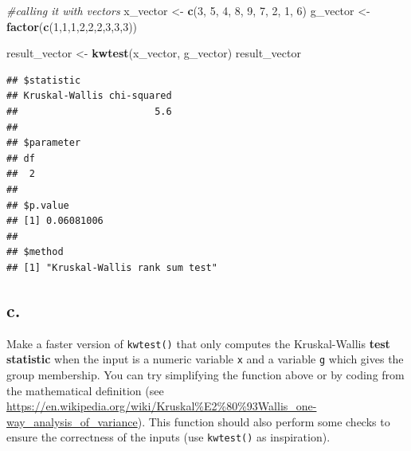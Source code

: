 \documentclass[
]{article}
\newenvironment{Shaded}{\begin{snugshade}}{\end{snugshade}}
\newcommand{\CommentTok}[1]{\textcolor[rgb]{0.56,0.35,0.01}{\textit{#1}}}
\newcommand{\DecValTok}[1]{\textcolor[rgb]{0.00,0.00,0.81}{#1}}
\newcommand{\FunctionTok}[1]{\textcolor[rgb]{0.13,0.29,0.53}{\textbf{#1}}}
\newcommand{\NormalTok}[1]{#1}
\newcommand{\OtherTok}[1]{\textcolor[rgb]{0.56,0.35,0.01}{#1}}
\begin{document}
\begin{Shaded}
\begin{Highlighting}[]
\CommentTok{\#calling it with vectors}
\NormalTok{x\_vector }\OtherTok{\textless{}{-}} \FunctionTok{c}\NormalTok{(}\DecValTok{3}\NormalTok{, }\DecValTok{5}\NormalTok{, }\DecValTok{4}\NormalTok{, }\DecValTok{8}\NormalTok{, }\DecValTok{9}\NormalTok{, }\DecValTok{7}\NormalTok{, }\DecValTok{2}\NormalTok{, }\DecValTok{1}\NormalTok{, }\DecValTok{6}\NormalTok{)}
\NormalTok{g\_vector }\OtherTok{\textless{}{-}} \FunctionTok{factor}\NormalTok{(}\FunctionTok{c}\NormalTok{(}\DecValTok{1}\NormalTok{,}\DecValTok{1}\NormalTok{,}\DecValTok{1}\NormalTok{,}\DecValTok{2}\NormalTok{,}\DecValTok{2}\NormalTok{,}\DecValTok{2}\NormalTok{,}\DecValTok{3}\NormalTok{,}\DecValTok{3}\NormalTok{,}\DecValTok{3}\NormalTok{))}

\NormalTok{result\_vector }\OtherTok{\textless{}{-}} \FunctionTok{kwtest}\NormalTok{(x\_vector, g\_vector)}
\NormalTok{result\_vector}
\end{Highlighting}
\end{Shaded}

\begin{verbatim}
## $statistic
## Kruskal-Wallis chi-squared 
##                        5.6 
## 
## $parameter
## df 
##  2 
## 
## $p.value
## [1] 0.06081006
## 
## $method
## [1] "Kruskal-Wallis rank sum test"
\end{verbatim}

\subsection{c.~}\label{c.-5}

Make a faster version of \texttt{kwtest()} that only computes the
Kruskal-Wallis \textbf{test statistic} when the input is a numeric
variable \texttt{x} and a variable \texttt{g} which gives the group
membership. You can try simplifying the function above or by coding from
the mathematical definition (see
\url{https://en.wikipedia.org/wiki/Kruskal\%E2\%80\%93Wallis_one-way_analysis_of_variance}).
This function should also perform some checks to ensure the correctness
of the inputs (use \texttt{kwtest()} as inspiration).
\end{document}
